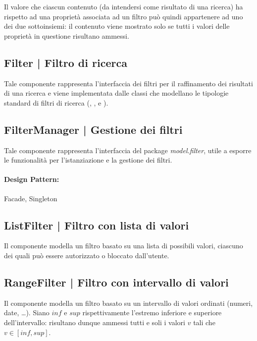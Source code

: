 \documentclass[10pt,a4paper,headinclude,footinclude,hidelinks]{scrreprt} %
\begin{document}
	Il valore che ciascun contenuto (da intendersi come risultato di una ricerca) ha rispetto ad una proprietà associata ad un filtro può quindi appartenere ad uno dei due sottoinsiemi: il contenuto viene mostrato solo se tutti i valori delle proprietà in questione risultano ammessi.

	\subsection[Filter]{Filter | Filtro di ricerca}
	\label{sec:stage:design:sistema:model.filter:filter}
	Tale componente rappresenta l'interfaccia dei filtri per il raffinamento dei risultati di una ricerca e viene implementata dalle classi che modellano le tipologie standard di filtri di ricerca (\textit{}, \textit{}, \textit{} e \textit{}).
	
	\subsection[FilterManager]{FilterManager | Gestione dei filtri}
	\label{sec:stage:design:sistema:model.filter:filter-manager}
	Tale componente rappresenta l'interfaccia del package \textit{model.filter}, utile a esporre le funzionalità per l'istanziazione e la gestione dei filtri.
	\paragraph{Design Pattern:} Facade, Singleton

	\subsection[ListFilter]{ListFilter | Filtro con lista di valori}
	\label{sec:stage:design:sistema:model.filter:list-filter}
	Il componente modella un filtro basato su una lista di possibili valori, ciascuno dei quali può essere autorizzato o bloccato dall'utente.

	\subsection[RangeFilter]{RangeFilter | Filtro con intervallo di valori}
	\label{sec:stage:design:sistema:model.filter:range-filter}
	Il componente modella un filtro basato su un intervallo di valori ordinati (numeri, date, \ldots). Siano $inf$ e $sup$ rispettivamente l'estremo inferiore e superiore dell'intervallo: risultano dunque ammessi tutti e soli i valori $v$ tali che $v \in \left[inf,sup\right]$.
\end{document}
